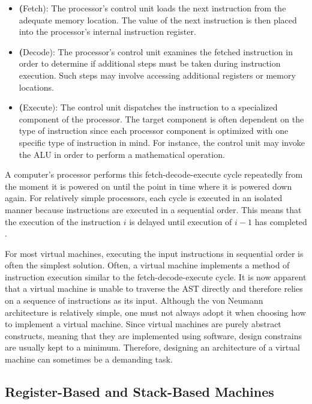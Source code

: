 \begin{itemize}
	\item \textbf(Fetch): The processor's control unit loads the next instruction from the adequate memory location.
	      The value of the next instruction is then placed into the processor's internal instruction register.
	\item \textbf(Decode):
	      The processor's control unit examines the fetched instruction in order to determine if additional steps must be taken during instruction execution.
	      Such steps may involve accessing additional registers or memory locations.
	\item \textbf(Execute):
	      The control unit dispatches the instruction to a specialized component of the processor.
	      The target component is often dependent on the type of instruction since each processor component is optimized with one specific type of instruction in mind.
	      For instance, the control unit may invoke the ALU in order to perform a mathematical operation.
\end{itemize}

A computer's processor performs this fetch-decode-execute cycle repeatedly from the moment it is powered on until the point in time where it is powered down again.
For relatively simple processors, each cycle is executed in an isolated manner because instructions are executed in a sequential order.
This means that the execution of the instruction $i$ is delayed until execution of $i - 1$ has completed \cite[pp.~208-209]{Ledin2020-yp}.

For most virtual machines, executing the input instructions in sequential order is often the simplest solution.
Often, a virtual machine implements a method of instruction execution similar to the fetch-decode-execute cycle.
It is now apparent that a virtual machine is unable to traverse the AST directly and therefore relies on a sequence of instructions as its input.
Although the von Neumann architecture is relatively simple, one must not always adopt it when choosing how to implement a virtual machine.
Since virtual machines are purely abstract constructs, meaning that they are implemented using software, design constrains are usually kept to a minimum.
Therefore, designing an architecture of a virtual machine can sometimes be a demanding task.

\subsection{Register-Based and Stack-Based Machines}

